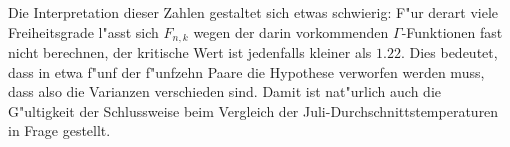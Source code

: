 Die Interpretation dieser Zahlen gestaltet sich etwas schwierig: F"ur derart
viele Freiheitsgrade l"asst sich $F_{n,k}$ wegen der darin
vorkommenden $\Gamma$-Funktionen fast nicht berechnen, der kritische Wert
ist jedenfalls kleiner als $1.22$. Dies bedeutet, dass in etwa f"unf der
f"unfzehn Paare die Hypothese verworfen werden muss, dass also die Varianzen
verschieden sind. Damit ist nat"urlich auch die G"ultigkeit der Schlussweise
beim Vergleich der Juli-Durchschnittstemperaturen in Frage gestellt.
